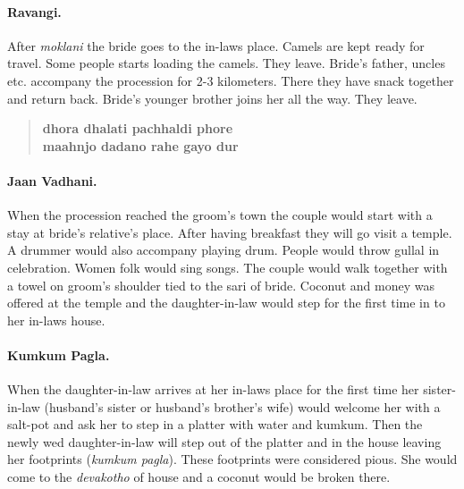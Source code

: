 \paragraph{Ravangi.} After \textit{moklani} the bride goes to the in-laws place. Camels are kept ready for travel. Some people starts loading the camels. They leave. Bride's father, uncles etc. accompany the procession for 2-3 kilometers. There they have snack together and return back. Bride's younger brother joins her all the way. They leave.

\begin{quote}
\textbf{
dhora dhalati pachhaldi phore\\
maahnjo dadano rahe gayo dur
}
\end{quote}

\paragraph{Jaan Vadhani.} When the procession reached the groom's town the
couple would start with a stay at bride's relative's place. After having
breakfast they will go visit a temple. A drummer would also accompany playing
drum. People would throw gullal in celebration. Women folk would sing songs.
The couple would walk together with a towel on groom's shoulder tied to the
sari of bride. Coconut and money was offered at the temple and the
daughter-in-law would step for the first time in to her in-laws house.

\paragraph{Kumkum Pagla.} When the daughter-in-law arrives at her in-laws place
for the first time her sister-in-law (husband's sister or husband's brother's
wife) would welcome her with a salt-pot and ask her to step in a
platter with water and kumkum. Then the newly wed daughter-in-law will step out
of the platter and in the house leaving her footprints (\textit{kumkum pagla}).
These footprints were considered pious. She would come to the
\textit{devakotho} of house and a coconut would be broken there.

